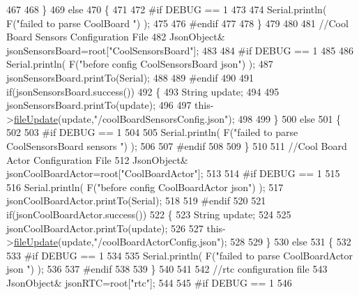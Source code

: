 \begin{DoxyCode}
467         
468     \}
469     \textcolor{keywordflow}{else}
470     \{
471     
472 \textcolor{preprocessor}{    #if DEBUG == 1 }
473 
474         Serial.println( F(\textcolor{stringliteral}{"failed to parse CoolBoard "}) );
475     
476 \textcolor{preprocessor}{    #endif}
477 
478     \}       
479 
480     
481     \textcolor{comment}{//Cool Board Sensors Configuration File}
482         JsonObject& jsonSensorsBoard=root[\textcolor{stringliteral}{"CoolSensorsBoard"}];
483 
484 \textcolor{preprocessor}{#if DEBUG == 1 }
485 
486     Serial.println( F(\textcolor{stringliteral}{"before config CoolSensorsBoard json"}) );
487     jsonSensorsBoard.printTo(Serial);
488 
489 \textcolor{preprocessor}{#endif }
490     
491     \textcolor{keywordflow}{if}(jsonSensorsBoard.success())
492     \{   
493         String update;
494     
495         jsonSensorsBoard.printTo(update);
496 
497         this->\hyperlink{class_cool_file_system_a13f2958f5b87757c31fc53797a30d23a}{fileUpdate}(update,\textcolor{stringliteral}{"/coolBoardSensorsConfig.json"});      
498 
499     \}
500     \textcolor{keywordflow}{else}
501     \{
502 
503 \textcolor{preprocessor}{    #if DEBUG == 1}
504 
505         Serial.println( F(\textcolor{stringliteral}{"failed to parse CoolSensorsBoard sensors "}) );   
506     
507 \textcolor{preprocessor}{    #endif}
508 
509     \}
510 
511     \textcolor{comment}{//Cool Board Actor Configuration File}
512         JsonObject& jsonCoolBoardActor=root[\textcolor{stringliteral}{"CoolBoardActor"}];
513 
514 \textcolor{preprocessor}{#if DEBUG == 1 }
515 
516     Serial.println( F(\textcolor{stringliteral}{"before config CoolBoardActor json"}) );
517     jsonCoolBoardActor.printTo(Serial);
518 
519 \textcolor{preprocessor}{#endif }
520     
521     \textcolor{keywordflow}{if}(jsonCoolBoardActor.success())
522     \{   
523         String update;
524     
525         jsonCoolBoardActor.printTo(update);
526 
527         this->\hyperlink{class_cool_file_system_a13f2958f5b87757c31fc53797a30d23a}{fileUpdate}(update,\textcolor{stringliteral}{"/coolBoardActorConfig.json"});        
528 
529     \}
530     \textcolor{keywordflow}{else}
531     \{
532 
533 \textcolor{preprocessor}{    #if DEBUG == 1}
534 
535         Serial.println( F(\textcolor{stringliteral}{"failed to parse CoolBoardActor json "}) );    
536     
537 \textcolor{preprocessor}{    #endif}
538 
539     \}
540 
541     
542     \textcolor{comment}{//rtc configuration file}
543         JsonObject& jsonRTC=root[\textcolor{stringliteral}{"rtc"}];
544 
545 \textcolor{preprocessor}{#if DEBUG == 1 }
546     

\end{DoxyCode}
